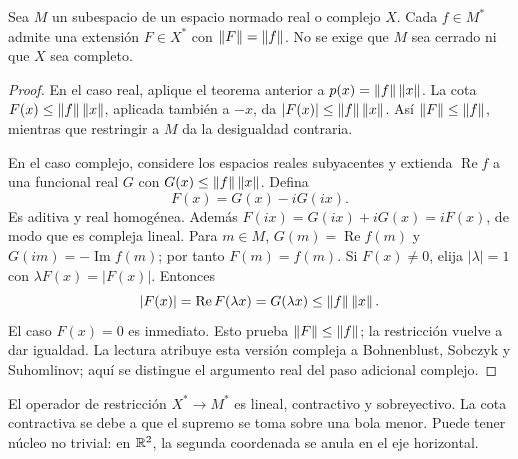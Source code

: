 \begin{teorema}\label{v3:hb-norma}
Sea $M$ un subespacio de un espacio normado real o complejo $X$. Cada $f\in M^*$ admite una extensión $F\in X^*$ con $\left\lVert F\right\rVert=\left\lVert f\right\rVert$. No se exige que $M$ sea cerrado ni que $X$ sea completo.
\end{teorema}
\begin{proof}
En el caso real, aplique el teorema anterior a $p(x)=\left\lVert f\right\rVert\left\lVert x\right\rVert$. La cota $F(x)\leq\left\lVert f\right\rVert\left\lVert x\right\rVert$, aplicada también a $-x$, da $|F(x)|\leq\left\lVert f\right\rVert\left\lVert x\right\rVert$. Así $\left\lVert F\right\rVert\leq\left\lVert f\right\rVert$, mientras que restringir a $M$ da la desigualdad contraria.

En el caso complejo, considere los espacios reales subyacentes y extienda $\operatorname{Re}f$ a una funcional real $G$ con $G(x)\leq\left\lVert f\right\rVert\left\lVert x\right\rVert$. Defina
\[
 F(x)=G(x)-iG(ix).
\]
Es aditiva y real homogénea. Además $F(ix)=G(ix)+iG(x)=iF(x)$, de modo que es compleja lineal. Para $m\in M$, $G(m)=\operatorname{Re}f(m)$ y $G(im)=-\operatorname{Im}f(m)$; por tanto $F(m)=f(m)$. Si $F(x)\ne0$, elija $|\lambda|=1$ con $\lambda F(x)=|F(x)|$. Entonces
\[
 |F(x)|=\operatorname{Re}F(\lambda x)=G(\lambda x)\leq\left\lVert f\right\rVert\left\lVert x\right\rVert.
\]
El caso $F(x)=0$ es inmediato. Esto prueba $\left\lVert F\right\rVert\leq\left\lVert f\right\rVert$; la restricción vuelve a dar igualdad. La lectura atribuye esta versión compleja a Bohnenblust, Sobczyk y Suhomlinov; aquí se distingue el argumento real del paso adicional complejo.
\end{proof}
El operador de restricción $X^*\to M^*$ es lineal, contractivo y sobreyectivo. La cota contractiva se debe a que el supremo se toma sobre una bola menor. Puede tener núcleo no trivial: en $\mathbb R^2$, la segunda coordenada se anula en el eje horizontal.

